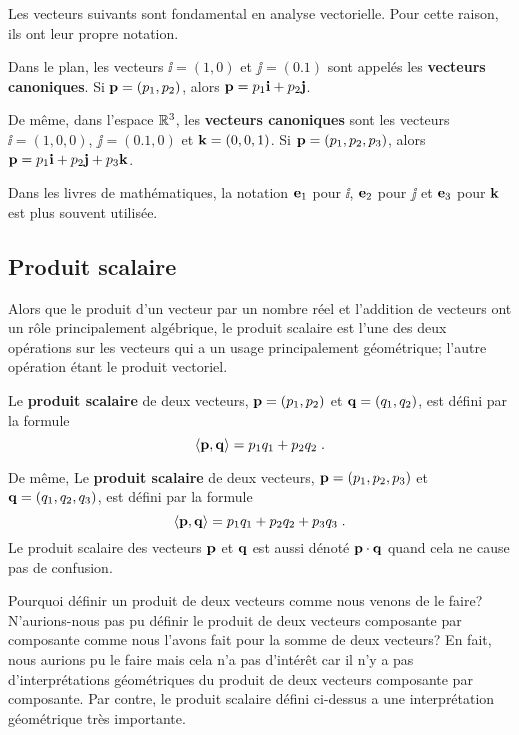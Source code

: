 {Les vecteurs suivants sont fondamental en analyse vectorielle.  Pour
cette raison, ils ont leur propre notation.

\begin{focus}{\dfn} 
Dans le plan, les vecteurs $\ii = (1,0)$ et $\jj = (0.1)$ sont appelés
les {\bfseries vecteurs canoniques}.  Si
$\mathbf{p}=(p_1,p_2)$, alors $\displaystyle \mathbf{p} = p_1 \mathbf{i} + p_2 \mathbf{j}$.

De même, dans l'espace $\mathbb{R}^3$, les {\bfseries vecteurs canoniques}
sont les vecteurs $\ii = (1,0,0)$, $\jj = (0.1,0)$ et $\mathbf{k} = (0,0,1)$.  Si
$\mathbf{p}=(p_1,p_2,p_3)$, alors
$\displaystyle \mathbf{p} = p_1 \mathbf{i} + p_2 \mathbf{j} + p_3 \mathbf{k}$.
\end{focus}

Dans les livres de mathématiques, la notation
$\mathbf{e}_1$ pour $\ii$, $\mathbf{e}_2$ pour $\jj$ et $\mathbf{e}_3$ pour
$\mathbf{k}$ est plus souvent utilisée.

\subsection{Produit scalaire \eng}

Alors que le produit d'un vecteur par un nombre réel et l'addition de
vecteurs ont un rôle principalement algébrique, le produit scalaire est l'une
des deux opérations sur les vecteurs qui a un usage principalement
géométrique; l'autre opération étant le produit vectoriel.

\begin{focus}{\dfn} 
Le {\bfseries produit scalaire} de deux vecteurs,
$\mathbf{p} = (p_1,p_2)$ et $\mathbf{q} = (q_1,q_2)$, est défini par la
formule
\[
\left\langle{\mathbf{p}} , {\mathbf{q}}\right\rangle = p_1 q_1 + p_2 q_2  \; .
\]

De même, Le {\bfseries produit scalaire} de deux vecteurs,
$\mathbf{p} = (p_1,p_2,p_3)$ et $\mathbf{q} = (q_1,q_2,q_3)$, est défini
par la formule
\[
\left\langle{\mathbf{p}} , {\mathbf{q}}\right\rangle = p_1 q_1 + p_2 q_2 + p_3 q_3 \; .
\]
Le produit scalaire des vecteurs $\mathbf{p}$ et $\mathbf{q}$ est aussi
dénoté $\mathbf{p} \cdot \mathbf{q}$ quand cela ne cause pas de confusion.
\end{focus}

Pourquoi définir un produit de deux vecteurs comme nous venons de le faire?
N'aurions-nous pas pu définir le produit de deux vecteurs composante par
composante comme nous l'avons fait pour la somme de deux vecteurs?  En
fait, nous aurions pu le faire mais cela n'a pas d'intérêt car il n'y a pas
d'interprétations géométriques du produit de deux vecteurs composante par
composante.  Par contre, le produit scalaire défini ci-dessus a une
interprétation géométrique très importante.

}
